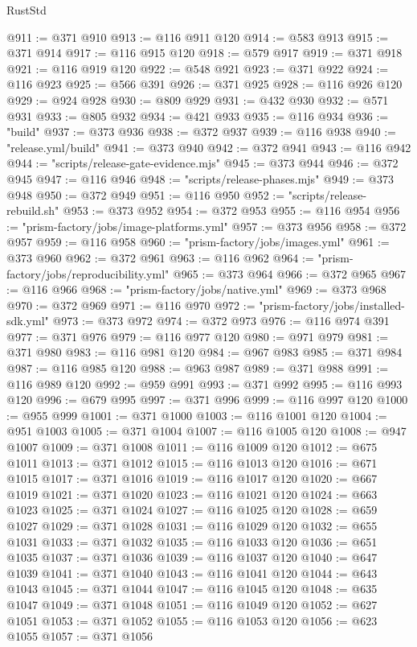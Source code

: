 \begin{lexlean}{RustStd}
\begin{coremodule}
@911 := @371 @910
@913 := @116 @911 @120
@914 := @583 @913
@915 := @371 @914
@917 := @116 @915 @120
@918 := @579 @917
@919 := @371 @918
@921 := @116 @919 @120
@922 := @548 @921
@923 := @371 @922
@924 := @116 @923
@925 := @566 @391
@926 := @371 @925
@928 := @116 @926 @120
@929 := @924 @928
@930 := @809 @929
@931 := @432 @930
@932 := @571 @931
@933 := @805 @932
@934 := @421 @933
@935 := @116 @934
@936 := "build"
@937 := @373 @936
@938 := @372 @937
@939 := @116 @938
@940 := "release.yml/build"
@941 := @373 @940
@942 := @372 @941
@943 := @116 @942
@944 := "scripts/release-gate-evidence.mjs"
@945 := @373 @944
@946 := @372 @945
@947 := @116 @946
@948 := "scripts/release-phases.mjs"
@949 := @373 @948
@950 := @372 @949
@951 := @116 @950
@952 := "scripts/release-rebuild.sh"
@953 := @373 @952
@954 := @372 @953
@955 := @116 @954
@956 := "prism-factory/jobs/image-platforms.yml"
@957 := @373 @956
@958 := @372 @957
@959 := @116 @958
@960 := "prism-factory/jobs/images.yml"
@961 := @373 @960
@962 := @372 @961
@963 := @116 @962
@964 := "prism-factory/jobs/reproducibility.yml"
@965 := @373 @964
@966 := @372 @965
@967 := @116 @966
@968 := "prism-factory/jobs/native.yml"
@969 := @373 @968
@970 := @372 @969
@971 := @116 @970
@972 := "prism-factory/jobs/installed-sdk.yml"
@973 := @373 @972
@974 := @372 @973
@976 := @116 @974 @391
@977 := @371 @976
@979 := @116 @977 @120
@980 := @971 @979
@981 := @371 @980
@983 := @116 @981 @120
@984 := @967 @983
@985 := @371 @984
@987 := @116 @985 @120
@988 := @963 @987
@989 := @371 @988
@991 := @116 @989 @120
@992 := @959 @991
@993 := @371 @992
@995 := @116 @993 @120
@996 := @679 @995
@997 := @371 @996
@999 := @116 @997 @120
@1000 := @955 @999
@1001 := @371 @1000
@1003 := @116 @1001 @120
@1004 := @951 @1003
@1005 := @371 @1004
@1007 := @116 @1005 @120
@1008 := @947 @1007
@1009 := @371 @1008
@1011 := @116 @1009 @120
@1012 := @675 @1011
@1013 := @371 @1012
@1015 := @116 @1013 @120
@1016 := @671 @1015
@1017 := @371 @1016
@1019 := @116 @1017 @120
@1020 := @667 @1019
@1021 := @371 @1020
@1023 := @116 @1021 @120
@1024 := @663 @1023
@1025 := @371 @1024
@1027 := @116 @1025 @120
@1028 := @659 @1027
@1029 := @371 @1028
@1031 := @116 @1029 @120
@1032 := @655 @1031
@1033 := @371 @1032
@1035 := @116 @1033 @120
@1036 := @651 @1035
@1037 := @371 @1036
@1039 := @116 @1037 @120
@1040 := @647 @1039
@1041 := @371 @1040
@1043 := @116 @1041 @120
@1044 := @643 @1043
@1045 := @371 @1044
@1047 := @116 @1045 @120
@1048 := @635 @1047
@1049 := @371 @1048
@1051 := @116 @1049 @120
@1052 := @627 @1051
@1053 := @371 @1052
@1055 := @116 @1053 @120
@1056 := @623 @1055
@1057 := @371 @1056

\end{coremodule}
\end{lexlean}
